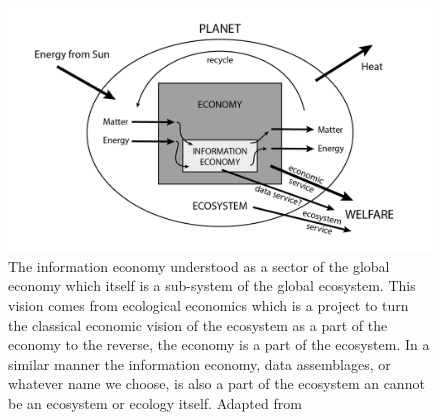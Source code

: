 \begin{figure}[!ht]
  \centering
    \includegraphics[width=5.5in]{figures/ecologicalecon}
  \caption{The information economy understood as a sector of the global economy which itself is a sub-system of the global ecosystem. This vision comes from ecological economics which is a project to turn the classical economic vision of the ecosystem as a part of the economy to the reverse, the economy is a part of the ecosystem. In a similar manner the information economy, data assemblages, or whatever name we choose, is also a part of the ecosystem an cannot be an ecosystem or ecology itself. Adapted from \citep[][p. 18]{daly_2004}}
\end{figure}
